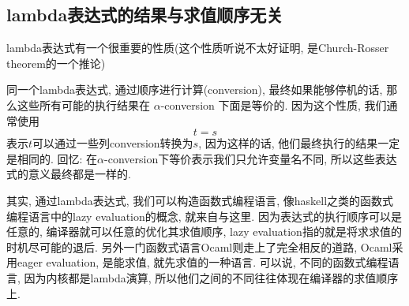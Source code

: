 \documentclass{article}
\begin{document}
\subsection{lambda表达式的结果与求值顺序无关}
lambda表达式有一个很重要的性质(这个性质听说不太好证明, 是Church-Rosser theorem的一个推论)
\begin{tcolorbox}
  同一个lambda表达式, 通过顺序进行计算(conversion), 最终如果能够停机的话, 那么这些所有可能的执行结果在 $\alpha$-conversion 下面是等价的.
  因为这个性质, 我们通常使用
  \[t = s\]
  表示$t$可以通过一些列conversion转换为$s$, 因为这样的话, 他们最终执行的结果一定是相同的.
  \tcblower
  回忆: 在$\alpha$-conversion下等价表示我们只允许变量名不同, 所以这些表达式的意义最终都是一样的.
\end{tcolorbox}
其实, 通过lambda表达式, 我们可以构造函数式编程语言, 像haskell之类的函数式编程语言中的lazy evaluation的概念, 就来自与这里. 因为表达式的执行顺序可以是任意的, 编译器就可以任意的优化其求值顺序, lazy evaluation指的就是将求求值的时机尽可能的退后. 另外一门函数式语言Ocaml则走上了完全相反的道路, Ocaml采用eager evaluation, 是能求值, 就先求值的一种语言.
可以说, 不同的函数式编程语言, 因为内核都是lambda演算, 所以他们之间的不同往往体现在编译器的求值顺序上.
\end{document}
